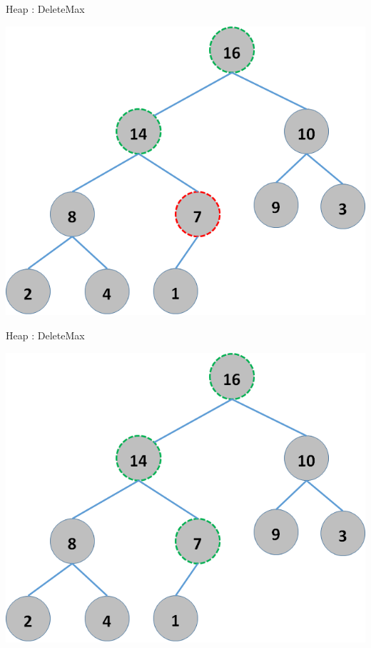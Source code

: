 \documentclass{beamer}
\begin{document}
\begin{frame}{Heap : DeleteMax}
    \begin{center}
        \includegraphics[scale=0.5]{heapDelete5.png}
    \end{center}
\end{frame}



\begin{frame}{Heap : DeleteMax}
    \begin{center}
        \includegraphics[scale=0.5]{heapDelete6.png}
    \end{center}
\end{frame}
\end{document}
